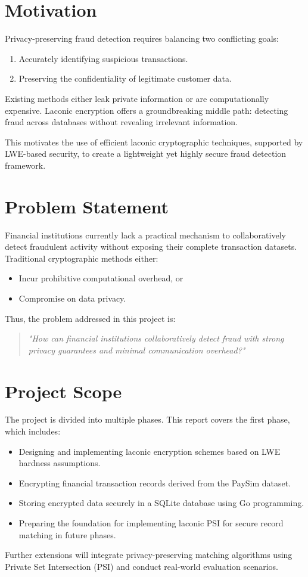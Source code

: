 \section{Motivation}

Privacy-preserving fraud detection requires balancing two conflicting goals:
\begin{enumerate}
    \item Accurately identifying suspicious transactions.
    \item Preserving the confidentiality of legitimate customer data.
\end{enumerate}

Existing methods either leak private information or are computationally expensive. Laconic encryption offers a groundbreaking middle path: detecting fraud across databases without revealing irrelevant information.

This motivates the use of efficient laconic cryptographic techniques, supported by LWE-based security, to create a lightweight yet highly secure fraud detection framework.

\section{Problem Statement}

Financial institutions currently lack a practical mechanism to collaboratively detect fraudulent activity without exposing their complete transaction datasets. Traditional cryptographic methods either:
\begin{itemize}
    \item Incur prohibitive computational overhead, or
    \item Compromise on data privacy.
\end{itemize}

Thus, the problem addressed in this project is:

\begin{quote}
\textit{"How can financial institutions collaboratively detect fraud with strong privacy guarantees and minimal communication overhead?"}
\end{quote}

\section{Project Scope}

The project is divided into multiple phases. This report covers the first phase, which includes:
\begin{itemize}
    \item Designing and implementing laconic encryption schemes based on LWE hardness assumptions.
    \item Encrypting financial transaction records derived from the PaySim dataset.
    \item Storing encrypted data securely in a SQLite database using Go programming.
    \item Preparing the foundation for implementing laconic PSI for secure record matching in future phases.
\end{itemize}

Further extensions will integrate privacy-preserving matching algorithms using Private Set Intersection (PSI) and conduct real-world evaluation scenarios.

\clearpage

